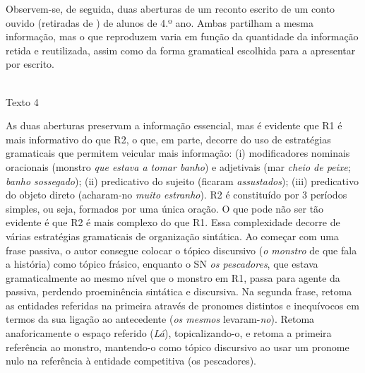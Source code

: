 \documentclass[output=paper]{LSP/langsci}
\begin{document}
Observem-se, de seguida, duas aberturas de um reconto escrito de um conto ouvido (retiradas de \citealt{costagoncalves2010}) de alunos de 4.º ano. Ambas partilham a mesma informação, mas o que reproduzem varia em função da quantidade da informação retida e reutilizada, assim como da forma gramatical escolhida para a apresentar por escrito.

\begin{center}
\\\vspace{1em}Texto 4 
\end{center}

As duas aberturas preservam a informação essencial, mas é evidente que R1 é mais informativo do que R2, o que, em parte, decorre do uso de estratégias gramaticais que permitem veicular mais informação: (i) modificadores nominais oracionais (monstro \textit{que estava a tomar banho}) e adjetivais (mar \textit{cheio de peixe}; \textit{banho sossegado}); (ii) predicativo do sujeito (ficaram \textit{assustados}); (iii) predicativo do objeto direto (acharam-no \textit{muito estranho}). R2 é constituído por 3 períodos simples, ou seja, formados por uma única oração. O que pode não ser tão evidente é que R2 é mais complexo do que R1. Essa complexidade decorre de várias estratégias gramaticais de organização sintática. Ao começar com uma frase passiva, o autor consegue colocar o tópico discursivo (\textit{o monstro} de que fala a história) como tópico frásico, enquanto o SN \textit{os pescadores}, que estava gramaticalmente ao mesmo nível que o monstro em R1, passa para agente da passiva, perdendo proeminência sintática e discursiva. Na segunda frase, retoma as entidades referidas na primeira através de pronomes distintos e inequívocos em termos da sua ligação ao antecedente (\textit{os mesmos} levaram-\textit{no}). Retoma anaforicamente o espaço referido (\textit{Lá}), topicalizando-o, e retoma a primeira referência ao monstro, mantendo-o como tópico discursivo ao usar um pronome nulo na referência à entidade competitiva (os pescadores). 
\end{document}
